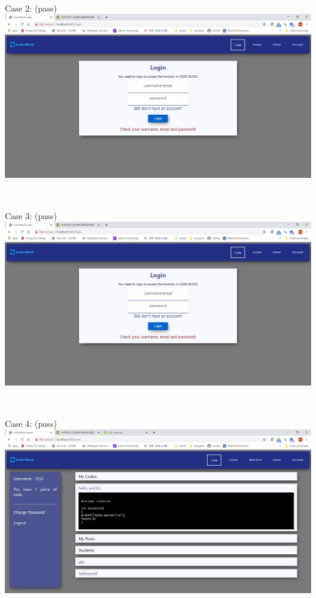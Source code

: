 ~

Case 2: (pass)\\
\includegraphics[scale=0.45]{Doc/Pics/case-5-2-2}

~

Case 3: (pass)\\
\includegraphics[scale=0.45]{Doc/Pics/case-5-2-3}

~

Case 4: (pass)\\
\includegraphics[scale=0.45]{Doc/Pics/case-5-2-4}

